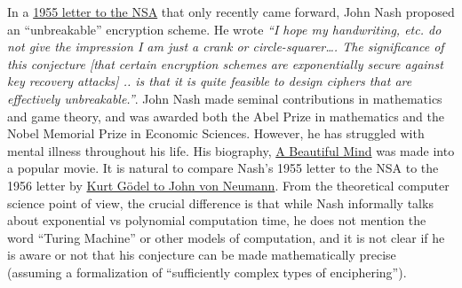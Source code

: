 In a
\href{https://www.nsa.gov/news-features/declassified-documents/nash-letters/assets/files/nash_letters1.pdf}{1955
letter to the NSA} that only recently came forward, John Nash proposed
an ``unbreakable'' encryption scheme. He wrote \emph{``I hope my
handwriting, etc. do not give the impression I am just a crank or
circle-squarer\ldots. The significance of this conjecture {[}that
certain encryption schemes are exponentially secure against key recovery
attacks{]} .. is that it is quite feasible to design ciphers that are
effectively unbreakable.''}. John Nash made seminal contributions in
mathematics and game theory, and was awarded both the Abel Prize in
mathematics and the Nobel Memorial Prize in Economic Sciences. However,
he has struggled with mental illness throughout his life. His biography,
\href{https://en.wikipedia.org/wiki/A_Beautiful_Mind_(book)}{A Beautiful
Mind} was made into a popular movie. It is natural to compare Nash's
1955 letter to the NSA to the 1956 letter by
\href{https://www.cs.cmu.edu/~aada/courses/15251s15/www/notes/godel-letter.pdf}{Kurt
Gödel to John von Neumann}. From the theoretical computer science point
of view, the crucial difference is that while Nash informally talks
about exponential vs polynomial computation time, he does not mention
the word ``Turing Machine'' or other models of computation, and it is
not clear if he is aware or not that his conjecture can be made
mathematically precise (assuming a formalization of ``sufficiently
complex types of enciphering'').
